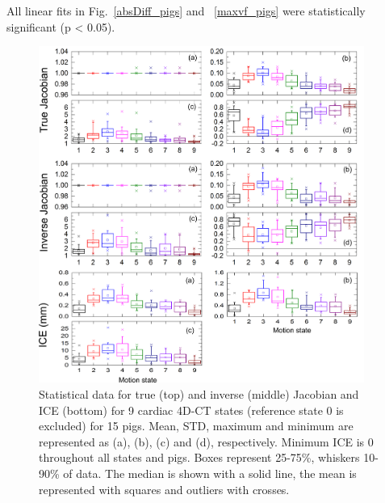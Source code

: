 All linear fits in Fig.~\ref{absDiff_pigs} and ~\ref{maxvf_pigs} were statistically significant (p < 0.05).



\newpage

\begin{figure}[H]
	\begin{center}		
		\includegraphics[width=0.95\textwidth]{./Vmm/Images/Jacobian_data_pigs.png}
		\caption{Statistical data for true (top) and inverse (middle) Jacobian and ICE (bottom) for 9 cardiac 4D-CT states (reference state 0 is excluded) for 15 pigs. Mean, STD, maximum and minimum are represented as (a), (b), (c) and (d), respectively.
		Minimum ICE is 0 throughout all states and pigs. Boxes represent 25-75\%, whiskers 10-90\%
		of data. The median is shown with a solid line, the mean is represented with squares and outliers with crosses.}
		\label{jacobian_data_pigs}
	\end{center}
\end{figure}

\newpage


